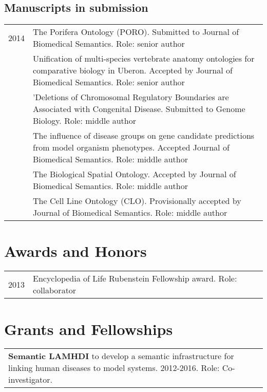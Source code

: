 \documentclass[11pt,fullpage]{article}
\begin{document}
\subsection*{Manuscripts in submission}

\begin{longtable}{p{0.5in}|p{5.5in}}

 2014 & The Porifera Ontology (PORO). Submitted to Journal of Biomedical Semantics. Role: senior author \\
      & Unification of multi-species vertebrate anatomy ontologies for comparative biology in Uberon. Accepted by Journal of Biomedical Semantics. Role: senior author \\
      & 'Deletions of Chromosomal Regulatory Boundaries are Associated with Congenital Disease. Submitted to Genome Biology. Role: middle author \\
      & The influence of disease groups on gene candidate predictions from model organism phenotypes. Accepted Journal of Biomedical Semantics. Role: middle author \\
      & The Biological Spatial Ontology. Accepted by Journal of Biomedical Semantics. Role: middle author \\
      & The Cell Line Ontology (CLO). Provisionally accepted by Journal of Biomedical Semantics. Role: middle author \\

\end{longtable}

\section*{Awards and Honors}

\begin{longtable}{p{0.5in}|p{5.5in}}

 2013 & Encyclopedia of Life Rubenstein Fellowship award. Role: collaborator \\

\end{longtable}


\section*{Grants and Fellowships}

\begin{tabular}{>{\everypar{\hangindent0.5in}}p{6in}}
	\textbf{Semantic LAMHDI} to develop a semantic infrastructure
        for linking human diseases to model systems. 2012-2016. Role: Co-investigator. \\
\end{tabular}
\end{document}
